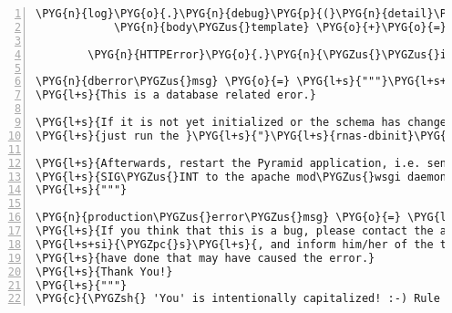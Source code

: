 \begin{Verbatim}[commandchars=\\\{\},numbers=left,firstnumber=1,stepnumber=5]
            \PYG{n}{log}\PYG{o}{.}\PYG{n}{debug}\PYG{p}{(}\PYG{n}{detail}\PYG{p}{)}
            \PYG{n}{body\PYGZus{}template} \PYG{o}{+}\PYG{o}{=} \PYG{l+s}{"}\PYG{l+s}{\textless{}pre\textgreater{}}\PYG{l+s+se}{\PYGZbs{}n}\PYG{l+s}{\PYGZdl{}\PYGZob{}detail\PYGZcb{}\textless{}/pre\textgreater{}}\PYG{l+s}{"}

        \PYG{n}{HTTPError}\PYG{o}{.}\PYG{n}{\PYGZus{}\PYGZus{}init\PYGZus{}\PYGZus{}}\PYG{p}{(}\PYG{n+nb+bp}{self}\PYG{p}{,} \PYG{n}{detail}\PYG{p}{,} \PYG{n}{body\PYGZus{}template}\PYG{o}{=}\PYG{n}{body\PYGZus{}template}\PYG{p}{)}

\PYG{n}{dberror\PYGZus{}msg} \PYG{o}{=} \PYG{l+s}{"""}\PYG{l+s+se}{\PYGZbs{}}
\PYG{l+s}{This is a database related eror.}

\PYG{l+s}{If it is not yet initialized or the schema has changed,}
\PYG{l+s}{just run the }\PYG{l+s}{"}\PYG{l+s}{rnas-dbinit}\PYG{l+s}{"}\PYG{l+s}{ script to (re-)initialize it.}

\PYG{l+s}{Afterwards, restart the Pyramid application, i.e. send a}
\PYG{l+s}{SIG\PYGZus{}INT to the apache mod\PYGZus{}wsgi daemon processes, and try again.}
\PYG{l+s}{"""}

\PYG{n}{production\PYGZus{}error\PYGZus{}msg} \PYG{o}{=} \PYG{l+s}{"""}\PYG{l+s+se}{\PYGZbs{}}
\PYG{l+s}{If you think that this is a bug, please contact the application administrator,}
\PYG{l+s+si}{\PYGZpc{}s}\PYG{l+s}{, and inform him/her of the time the error occurred, and anything you might}
\PYG{l+s}{have done that may have caused the error.}
\PYG{l+s}{Thank You!}
\PYG{l+s}{"""}
\PYG{c}{\PYGZsh{} 'You' is intentionally capitalized! :-) Rule 84: http://goo.gl/BLBwX}
\end{Verbatim}


